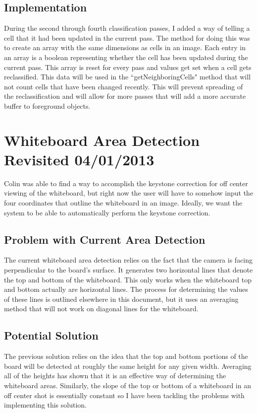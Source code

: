 \documentclass[]{article}
\begin{document}
		\subsection{Implementation}
			During the second through fourth classification passes, I added a way of telling a cell that it had been updated in the current pass. The method for doing this was to create an array with the same dimensions as cells in an image. Each entry in an array is a boolean representing whether the cell has been updated during the current pass. This array is reset for every pass and values get set when a cell gets reclassified. This data will be used in the ``getNeighboringCells" method that will not count cells that have been changed recently. This will prevent spreading of the reclassification and will allow for more passes that will add a more accurate buffer to foreground objects. 
			
	
	\section{Whiteboard Area Detection Revisited 04/01/2013}
		Colin was able to find a way to accomplish the keystone correction for off center viewing of the whiteboard, but right now the user will have to somehow input the four coordinates that outline the whiteboard in an image. Ideally, we want the system to be able to automatically perform the keystone correction. 
		
		\subsection{Problem with Current Area Detection}
			The current whiteboard area detection relies on the fact that the camera is facing perpendicular to the board's surface. It generates two horizontal lines that denote the top and bottom of the whiteboard. This only works when the whiteboard top and bottom actually are horizontal lines. The process for determining the values of these lines is outlined elsewhere in this document, but it uses an averaging method that will not work on diagonal lines for the whiteboard. 
			
		\subsection{Potential Solution}
			The previous solution relies on the idea that the top and bottom portions of the board will be detected at roughly the same height for any given width. Averaging all of the heights has shown that it is an effective way of determining the whiteboard areas. Similarly, the slope of the top or bottom of a whiteboard in an off center shot is essentially constant so I have been tackling the problems with implementing this solution.
			
\end{document}
